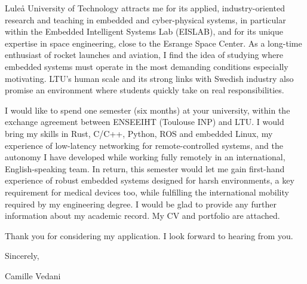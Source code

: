 \documentclass[11pt]{article}
\newcommand{\myname}{Camille Vedani}
\begin{document}
Luleå University of Technology attracts me for its applied, industry-oriented research and teaching in
embedded and cyber-physical systems, in particular within the Embedded Intelligent Systems Lab (EISLAB),
and for its unique expertise in space engineering, close to the Esrange Space Center. As a long-time
enthusiast of rocket launches and aviation, I find the idea of studying where embedded systems must operate
in the most demanding conditions especially motivating. LTU's human scale and its strong links with Swedish
industry also promise an environment where students quickly take on real responsibilities.

I would like to spend one semester (six months) at your university, within the exchange agreement between ENSEEIHT (Toulouse INP) and LTU. I would bring
my skills in Rust, C/C++, Python, ROS and embedded Linux, my experience of low-latency networking for
remote-controlled systems, and the autonomy I have developed while working fully remotely in an international,
English-speaking team. In return, this semester would let me gain first-hand experience of robust embedded systems designed for harsh environments, a key
requirement for medical devices too, while fulfilling the
international mobility required by my engineering degree. I would be glad to provide any further
information about my academic record. My CV and portfolio are attached.

Thank you for considering my application. I look forward to hearing from you.

Sincerely,

\vspace{1.8em}
\myname
\end{document}
